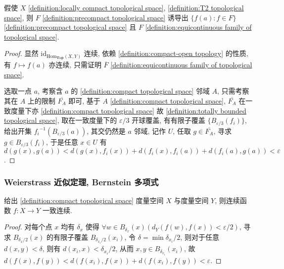 \begin{theorem}
    假使 \(X\) \ref{definition:locally compact topological space}, \ref{definition:T2 topological space}, 则 \(F\) \ref{definition:precompact topological space}
    诱导出 \(\{f(a) : f \in F\}\) \ref{definition:precompact topological space} 且 \(F\) \ref{definition:equicontinuous family of topological space}.

    \begin{proof}
        显然 \(\mathrm{id}_{\mathrm{Hom}_{\mathbf{Top}} (X,Y)}\) 连续, 依赖 \ref{definition:compact-open topology} 的性质,
        有 \(f \mapsto f(a)\) 亦连续, 只需证明 \(\overline{F}\) \ref{definition:equicontinuous family of topological space}.

        选取一点 \(a\), 考察含 \(a\) 的 \ref{definition:compact topological space} 邻域 \(A\),
        只需考察其在 \(A\) 上的限制 \(\overline{F_A}\) 即可, 基于 \(A\) \ref{definition:compact topological space},
        \(\overline{F_A}\) 在一致度量下亦 \ref{definition:compact topological space} 故 \ref{definition:totally bounded topological space},
        取在一致度量下的 \(\varepsilon/3\) 开球覆盖, 有有限子覆盖 \(\{B_{\varepsilon/3} (f_i)\}\), 给出开集 \({f_i}^{-1} (B_{\varepsilon/3} (a))\),
        其交仍然是 \(a\) 邻域, 记作 \(U\), 任取 \(g \in \overline{F_A}\), 寻求 \(g \in B_{\varepsilon/3} (f_i)\), 于是任意 \(x \in U\) 有 \(d (g(x),g(a)) < d(g(x),f_i(x)) + d(f_i(x),f_i(a)) + d(f_i(a),g(a)) < \varepsilon\).
    \end{proof}
\end{theorem}

\subsubsection{Weierstrass 近似定理, Bernstein 多项式}

\begin{lemma}
    \label {lemma:Dirichlet-Heine lemma}
    给出 \ref{definition:compact topological space} 度量空间 \(X\) 与度量空间 \(Y\),
    则连续函数 \(f:X \to Y\) 一致连续.

    \begin{proof}
        对每个点 \(x\) 均有 \(\delta_x\) 使得 \(\forall w \in B_{\delta_x} (x) (d_Y (f(w),f(x)) < \varepsilon/2)\),
        寻求 \(B_{\delta_x/2} (x)\) 的有限子覆盖 \(B_{\delta_{x_i}/2} (x_i)\), 令 \(\delta = \min \delta_{x_i}/2\),
        则对于任意 \(d (x,y) < \delta\), 则有 \(d (x_i,x) < \delta_{x_i}/2\), 从而 \(x,y \in B_{\delta_{x_i}} (x_i)\),
        故 \(d (f(x),f(y)) < d(f(x_i),f(x)) + d(f(x_i),f(y)) < \varepsilon\).
    \end{proof}
\end{lemma}

